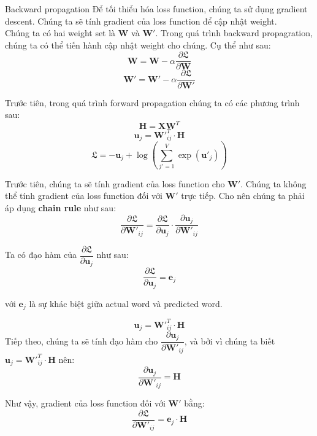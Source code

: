 \documentclass[12pt]{article}
\makeatletter
\renewcommand\paragraph{\@startsection{paragraph}{4}{\z@}
            {-2.5ex\@plus -1ex \@minus -.25ex}
            {1.25ex \@plus .25ex}
            {\normalfont\normalsize\bfseries}}
\newcommand{\twiceIndent}{\hspace{\parindent}}
\makeatother
\begin{document}
\paragraph{Backward propagation}
Để tối thiểu hóa loss function, chúng ta sử dụng gradient descent. Chúng ta sẽ tính gradient của loss function để cập nhật weight.\\

\indent Chúng ta có hai weight set là $\boldsymbol{W}$ và $\boldsymbol{W'}$. Trong quá trình backward propagration, chúng ta có thể tiến hành cập nhật weight cho chúng. Cụ thể như sau:
$$\boldsymbol{W} = \boldsymbol{W} - \alpha \dfrac{\partial \mathfrak{L}}{\partial \boldsymbol{W}}$$ 
$$\boldsymbol{W'} = \boldsymbol{W'} - \alpha \dfrac{\partial \mathfrak{L}}{\partial \boldsymbol{W'}}$$ 

\indent Trước tiên, trong quá trình forward propagation chúng ta có các phương trình sau:
$$\boldsymbol{H} = \boldsymbol{XW}^T$$
$$\boldsymbol{u}_j = \boldsymbol{W'}_{ij}^T \cdot \boldsymbol{H}$$
$$\mathfrak{L} = -\boldsymbol{u}_j + \log{\left ( \sum_{j'=1}^V \exp{(\boldsymbol{u'}_j)} \right )}$$

\indent Trước tiên, chúng ta sẽ tính gradient của loss function cho $\boldsymbol{W'}$. Chúng ta không thể tính gradient của loss function đối với $\boldsymbol{W'}$ trực tiếp. Cho nên chúng ta phải áp dụng \textbf{chain rule} như sau:
$$\dfrac{\partial \mathfrak{L}}{\partial \boldsymbol{W'}_{ij}} = \dfrac{\partial \mathfrak{L}}{\partial \boldsymbol{u}_j} \cdot \dfrac{\partial \boldsymbol{u}_j}{\partial \boldsymbol{W'}_{ij}}$$

\indent Ta có đạo hàm của $\dfrac{\partial \mathfrak{L}}{\partial \boldsymbol{u}_j}$ như sau:
\begin{equation}
  \dfrac{\partial \mathfrak{L}}{\partial \boldsymbol{u}_j} = \boldsymbol{e}_j
\end{equation}

\twiceIndent với $\boldsymbol{e}_j$ là sự khác biệt giữa actual word và predicted word.

\vskip 0.5cm
$$\boldsymbol{u}_j = \boldsymbol{W'}_{ij}^T \cdot \boldsymbol{H}$$
\indent Tiếp theo, chúng ta sẽ tính đạo hàm cho $\dfrac{\partial \boldsymbol{u}_j}{\partial \boldsymbol{W'}_{ij}}$, và bởi vì chúng ta biết $\boldsymbol{u}_j = \boldsymbol{W'}_{ij}^T \cdot \boldsymbol{H}$ nên:
$$\dfrac{\partial \boldsymbol{u}_j}{\partial \boldsymbol{W'}_{ij}} = \boldsymbol{H}$$

\indent Như vậy, gradient của loss function đối với $\boldsymbol{W'}$ bằng:
$$\dfrac{\partial \mathfrak{L}}{\partial \boldsymbol{W'}_{ij}} = \boldsymbol{e}_j \cdot \boldsymbol{H}$$
\end{document}
